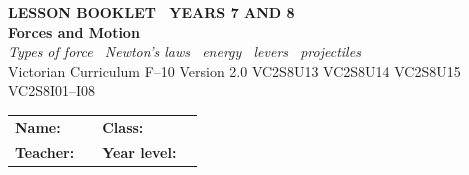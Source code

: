 \documentclass[11pt,a4paper]{article}
\newif\ifteacher
\begin{document}
\setlength{\parindent}{0pt}
\setlength{\parskip}{4pt}

\thispagestyle{plain}
\ifteacher
  \tcbset{coverstamp/.style={overlay={\node[anchor=north east, fill=ScaffoldRed, text=white, font=\headingfont\bfseries\small,
    rounded corners=2pt, inner sep=4pt] at ([xshift=-4mm, yshift=-4mm]frame.north east) {TEACHER COPY --- answers in red};}}}
\else
\fi
\begin{tcolorbox}[
  enhanced, breakable=false, arc=4mm, coverstamp,
  colback=NavyBlue, colframe=NavyBlue,
  left=6mm, right=6mm, top=9mm, bottom=9mm,
  boxrule=0pt
]
  \begin{center}
    {\headingfont\bfseries\color{Sky}\footnotesize\MakeUppercase{Lesson Booklet \textbullet\ Years 7 and 8}}\\[10pt]
    {\headingfont\bfseries\color{white}\fontsize{40}{44}\selectfont Forces and Motion}\\[8pt]
    {\large\color{white!85!NavyBlue}\itshape Types of force \textbullet\ Newton's laws \textbullet\ energy \textbullet\ levers \textbullet\ projectiles}\\[14pt]
    {\headingfont\color{white!72!NavyBlue}\normalsize Victorian Curriculum F--10 Version 2.0 \textbar{}
     VC2S8U13 \textbar{} VC2S8U14 \textbar{} VC2S8U15 \textbar{} VC2S8I01--I08}
  \end{center}
\end{tcolorbox}

\vspace{10pt}

\begin{tabular}{@{}p{3.5cm} p{6cm} p{2cm} p{3.5cm}@{}}
  \textbf{Name:}    & \underline{\hspace{5.8cm}} & \textbf{Class:}   & \underline{\hspace{3.3cm}} \\[8pt]
  \textbf{Teacher:} & \underline{\hspace{5.8cm}} & \textbf{Year level:} & \underline{\hspace{3.3cm}} \\
\end{tabular}

\vspace{10pt}
\end{document}
